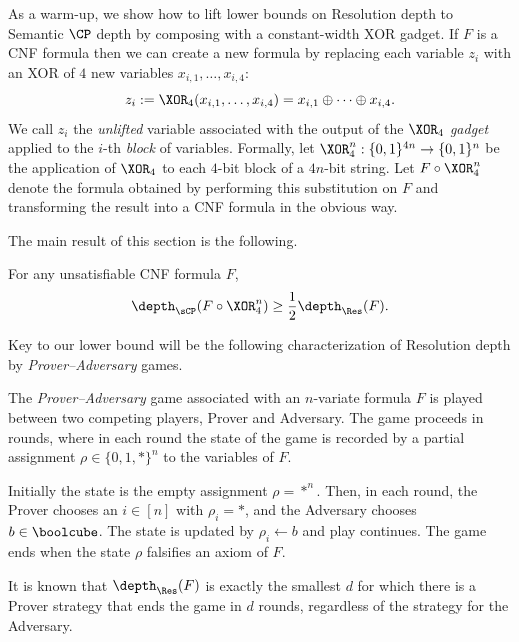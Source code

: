 As a warm-up, we show how to lift lower bounds on Resolution depth to Semantic $\CP$ depth by composing with a constant-width XOR gadget.
If $F$ is a CNF formula then we can create a new formula by replacing each variable $z_i$ with an XOR of $4$ new variables $x_{i,1},\ldots, x_{i,4}$:
\[z_i := \XOR_4(x_{i,1},\ldots, x_{i,4}) = x_{i,1} \oplus \cdots \oplus x_{i,4}. \] 
We call $z_i$ the \emph{unlifted} variable associated with the output of the $\XOR_4$ \emph{gadget} applied to the $i$-th \emph{block} of variables. 
Formally, let $\XOR_4^n:\{0,1\}^{4n} \rightarrow \{0,1\}^n$ be the application of $\XOR_4$ to each $4$-bit block of a $4n$-bit string. 
Let $F \circ \XOR_4^n$ denote the formula obtained by performing this substitution on $F$ and transforming the result into a CNF formula in the obvious way.

The main result of this section is the following.
\begin{theorem}\label{thm:cp-depth-lifting}
	For any unsatisfiable CNF formula $F$, \[\depth_{\sCP}(F\circ \XOR_4^n) \geq \frac{1}{2} \depth_{\Res}(F).\]
\end{theorem}

Key to our lower bound will be the following characterization of Resolution depth by \emph{Prover--Adversary} games.

\begin{definition}\label{def:prover-adversary}
	The \emph{Prover--Adversary} game associated with an $n$-variate formula $F$ is played between two competing players, Prover and Adversary. 
	The game proceeds in rounds, where in each round the state of the game is recorded by a partial assignment $\rho\in\{0,1,*\}^n$ to the variables of $F$. 

	Initially the state is the empty assignment $\rho=*^n$. 
	Then, in each round, the Prover chooses an $i \in [n]$ with $\rho_i = *$, and the Adversary chooses $b \in \boolcube$.
	The state is updated by $\rho_i \leftarrow b$ and play continues.
	The game ends when the state $\rho$ falsifies an axiom of $F$. 

	It is known \cite{Pudlak00} that $\depth_{\Res}(F)$ is exactly the smallest $d$ for which there is a Prover strategy that ends the game in $d$ rounds, regardless of the strategy for the Adversary.
\end{definition}

